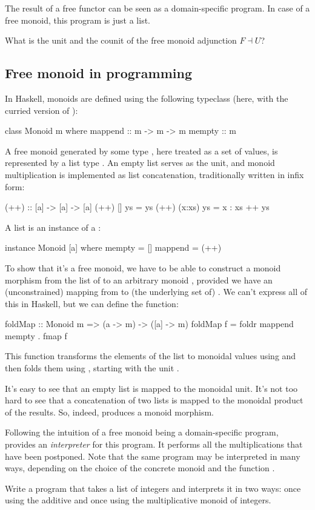 \documentclass[DaoFP]{subfiles}
\begin{document}
The result of a free functor can be seen as a domain-specific program. In case of a free monoid, this program is just a list.

\begin{exercise}
What is the unit and the counit of the free monoid adjunction $F \dashv U$?
\end{exercise}

\subsection{Free monoid in programming}

In Haskell, monoids are defined using the following typeclass (here, with the curried version of ):
\begin{haskell}
class Monoid m where
  mappend :: m -> m -> m
  mempty  :: m
\end{haskell}

A free monoid generated by some type , here treated as a set of values, is represented by a list type \hask{[a]}. An empty list serves as the unit, and monoid multiplication is implemented as list concatenation, traditionally written in infix form:
\begin{haskell}
(++) :: [a] -> [a] -> [a]
(++) []     ys = ys
(++) (x:xs) ys = x : xs ++ ys
\end{haskell}
A list is an instance of a :
\begin{haskell}
instance Monoid [a] where
  mempty = []
  mappend = (++)
\end{haskell}

To show that it's a free monoid, we have to be able to construct a monoid morphism from the list of  to an arbitrary monoid , provided we have an (unconstrained) mapping from  to (the underlying set of) . We can't express all of this in Haskell, but we can define the function:
\begin{haskell}
foldMap :: Monoid m => (a -> m) -> ([a] -> m)
foldMap f = foldr mappend mempty . fmap f
\end{haskell}
This function transforms the elements of the list to monoidal values using  and then folds them using , starting with the unit . 

It's easy to see that an empty list is mapped to the monoidal unit. It's not too hard to see that a concatenation of two lists is mapped to the monoidal product of the results. So, indeed,  produces a monoid morphism. 

Following the intuition of a free monoid being a domain-specific program,  provides an \emph{interpreter} for this program. It performs all the multiplications that have been postponed. Note that the same program may be interpreted in many ways, depending on the choice of the concrete monoid and the function .

\begin{exercise}
Write a program that takes a list of integers and interprets it in two ways: once using the additive and once using the multiplicative monoid of integers.
\end{exercise}
\end{document}
